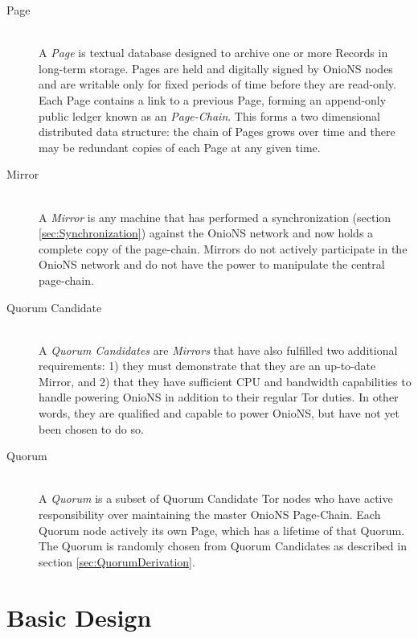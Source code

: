 \begin{description}
	\item[Page] \hfill \\
		A \emph{Page} is textual database designed to archive one or more Records in long-term storage. Pages are held and digitally signed by OnioNS nodes and are writable only for fixed periods of time before they are read-only. Each Page contains a link to a previous Page, forming an append-only public ledger known as an \emph{Page-Chain}. This forms a two dimensional distributed data structure: the chain of Pages grows over time and there may be redundant copies of each Page at any given time. 
		
	\item[Mirror] \hfill \\
		A \emph{Mirror} is any machine that has performed a synchronization (section \ref{sec:Synchronization}) against the OnioNS network and now holds a complete copy of the page-chain. Mirrors do not actively participate in the OnioNS network and do not have the power to manipulate the central page-chain.

	\item[Quorum Candidate] \hfill \\
		A \emph{Quorum Candidates} are \emph{Mirrors} that have also fulfilled two additional requirements: 1) they must demonstrate that they are an up-to-date Mirror, and 2) that they have sufficient CPU and bandwidth capabilities to handle powering OnioNS in addition to their regular Tor duties. In other words, they are qualified and capable to power OnioNS, but have not yet been chosen to do so.
		
	\item[Quorum] \hfill \\
		A \emph{Quorum} is a subset of Quorum Candidate Tor nodes who have active responsibility over maintaining the master OnioNS Page-Chain. Each Quorum node actively its own Page, which has a lifetime of that Quorum. The Quorum is randomly chosen from Quorum Candidates as described in section \ref{sec:QuorumDerivation}.
		
\end{description}

\section{Basic Design}


